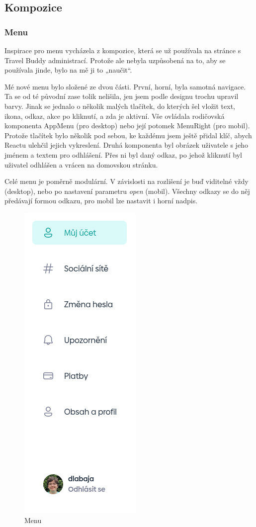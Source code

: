 \subsection{Kompozice}

\subsubsection{Menu}
Inspirace pro menu vycházela z kompozice, která se už používala na stránce s Travel Buddy administrací. Protože ale nebyla uzpůsobená na to, aby se používala jinde, bylo na mě ji to „naučit“.

Mé nové menu bylo složené ze dvou části. První, horní, byla samotná navigace. Ta se od té původní zase tolik nelišila, jen jsem podle designu trochu upravil barvy. Jinak se jednalo o několik malých tlačítek, do kterých šel vložit text, ikona, odkaz, akce po kliknutí, a zda je aktivní. Vše ovládala rodičovská komponenta AppMenu (pro desktop) nebo její potomek MenuRight (pro mobil). Protože tlačítek bylo několik pod sebou, ke každému jsem ještě přidal klíč, abych Reactu ulehčil jejich vykreslení. Druhá komponenta byl obrázek uživatele s jeho jménem a textem pro odhlášení. Přes ni byl daný odkaz, po jehož kliknutí byl uživatel odhlášen a vrácen na domovskou stránku.

Celé menu je poměrně modulární. V závislosti na rozlišení je buď viditelné vždy (desktop), nebo po nastavení parametru \textit{open} (mobil). Všechny odkazy se do něj předávají formou odkazu, pro mobil lze nastavit i horní nadpis.

\begin{figure}[!h]
    \centering
    \includegraphics[width=0.24\linewidth]{obrazky/menu.png}
    \caption{Menu}
\end{figure}


